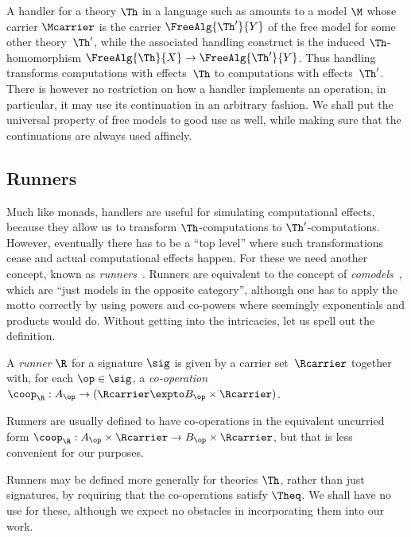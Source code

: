 A handler for a theory $\Th$ in a language such as  amounts to a model 
$\M$ whose carrier $\Mcarrier$
is the carrier $\FreeAlg{\Th'}{Y}$ of the free model
for some other theory~$\Th'$, while the associated handling
construct is the induced $\Th$-homomorphism $\FreeAlg{\Th}{X} \to \FreeAlg{\Th'}{Y}$.
Thus handling transforms computations with effects~$\Th$ to computations with
effects~$\Th'$. There is however no restriction on how a handler implements an
operation, in particular, it may use its continuation in an arbitrary
fashion.
%
We shall put the universal property of free models to good use as well, while
making sure that the continuations are always used affinely.

\subsection{Runners}
\label{sect:purerunners}

Much like monads, handlers are useful for simulating computational effects, because they
allow us to transform $\Th$-computations to $\Th'$-computations. However, eventually there
has to be a ``top level'' where such transformations cease and actual computational
effects happen. For these we need another concept, known as
\emph{runners}~\cite{Uustalu:Runners}.
%
Runners are equivalent to the concept of
\emph{comodels}~\cite{Plotkin:TensorsOfModels,Power:Comodels}, which are ``just
models in the opposite category'', although one has to apply the motto
correctly by using powers and co-powers where seemingly exponentials and products would
do. 
Without getting into the intricacies, let us spell out the definition.

\begin{definition}
  A \emph{runner} $\R$ for a signature $\sig$ is given by a carrier set~$\Rcarrier$ together with, for
  each $\op \in \sig$, a
  \emph{co-operation~$\coop_{\R} : A_\op \to (\Rcarrier \expto B_\op \times \Rcarrier)$.}
\end{definition}

%
Runners are usually defined to have co-operations in the equivalent uncurried form
$\coop_\R : A_\op \times \Rcarrier \to B_\op \times \Rcarrier$, but that is less convenient for our purposes.

Runners may be defined more generally for theories $\Th$, rather than just signatures,
by requiring that the co-operations satisfy $\Theq$. We shall have no use for these,
although we expect no obstacles in incorporating them into our work.

